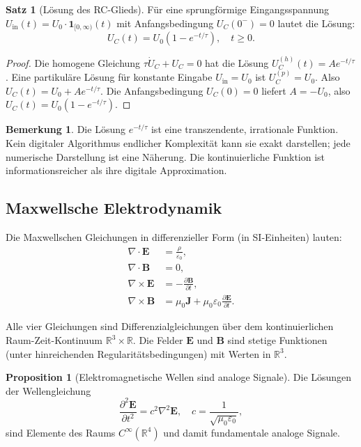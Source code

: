 ﻿\documentclass[a4paper,12pt]{article}
\theoremstyle{definition}
\newtheorem{satz}{Satz}
\newtheorem{bemerkung}{Bemerkung}
\newtheorem{proposition}{Proposition}
\begin{document}
\begin{satz}[Lösung des RC-Glieds]
\label{satz:rc}
Für eine sprungförmige Eingangsspannung $U_{\mathrm{in}}(t) = U_0 \cdot \mathbf{1}_{[0,\infty)}(t)$
mit Anfangsbedingung $U_C(0^-) = 0$ lautet die Lösung:
\[
U_C(t) = U_0 \left(1 - e^{-t/\tau}\right), \quad t \geq 0.
\]
\end{satz}

\begin{proof}
Die homogene Gleichung $\tau \dot{U}_C + U_C = 0$ hat die Lösung
$U_C^{(h)}(t) = A e^{-t/\tau}$.  Eine partikuläre Lösung für konstante
Eingabe $U_{\mathrm{in}} = U_0$ ist $U_C^{(p)} = U_0$.  Also
$U_C(t) = U_0 + A e^{-t/\tau}$.  Die Anfangsbedingung $U_C(0) = 0$ liefert
$A = -U_0$, also $U_C(t) = U_0(1 - e^{-t/\tau})$.
\end{proof}

\begin{bemerkung}
Die Lösung $e^{-t/\tau}$ ist eine transzendente, irrationale Funktion.
Kein digitaler Algorithmus endlicher Komplexität kann sie exakt darstellen;
jede numerische Darstellung ist eine Näherung.  Die kontinuierliche Funktion
ist informationsreicher als ihre digitale Approximation.
\end{bemerkung}

\subsection{Maxwellsche Elektrodynamik}

Die Maxwellschen Gleichungen in differenzieller Form (in SI-Einheiten) lauten:
\begin{align}
\nabla \cdot \mathbf{E} &= \frac{\rho}{\varepsilon_0}, \label{eq:gauss_e} \\
\nabla \cdot \mathbf{B} &= 0, \label{eq:gauss_b} \\
\nabla \times \mathbf{E} &= -\frac{\partial \mathbf{B}}{\partial t}, \label{eq:faraday} \\
\nabla \times \mathbf{B} &= \mu_0 \mathbf{J} + \mu_0 \varepsilon_0 \frac{\partial \mathbf{E}}{\partial t}. \label{eq:ampere}
\end{align}

Alle vier Gleichungen sind Differenzialgleichungen über dem kontinuierlichen
Raum-Zeit-Kontinuum $\mathbb{R}^3 \times \mathbb{R}$.  Die Felder $\mathbf{E}$ und $\mathbf{B}$
sind stetige Funktionen (unter hinreichenden Regularitätsbedingungen) mit Werten in $\mathbb{R}^3$.

\begin{proposition}[Elektromagnetische Wellen sind analoge Signale]
Die Lösungen der Wellengleichung
\[
\frac{\partial^2 \mathbf{E}}{\partial t^2} = c^2 \nabla^2 \mathbf{E}, \quad c = \frac{1}{\sqrt{\mu_0\varepsilon_0}},
\]
sind Elemente des Raums $C^\infty(\mathbb{R}^4)$ und damit fundamentale analoge Signale.
\end{proposition}
\end{document}
